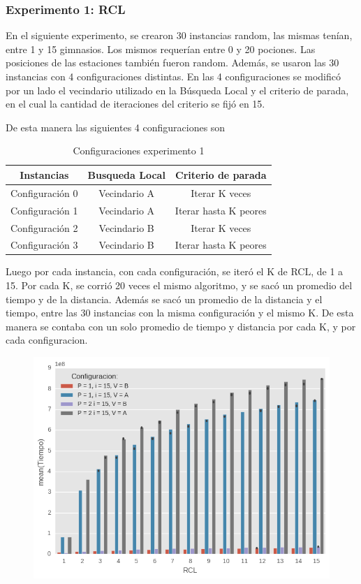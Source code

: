 \subsubsection{Experimento 1: RCL}

En el siguiente experimento, se crearon 30 instancias random, las mismas tenían, entre 1 y 15 gimnasios. Los mismos requerían entre 0 y 20 pociones. Las posiciones de las estaciones también fueron random. Además, se usaron las 30 instancias con 4 configuraciones distintas. En las 4 configuraciones se modificó por un lado el vecindario utilizado en la Búsqueda Local y el criterio de parada, en el cual la cantidad de iteraciones del criterio se fijó en 15.

De esta manera las siguientes 4 configuraciones son 

\begin{table}[H]
\centering
\begin{tabular}{ |c|c|c| } 
 \hline
 Instancias&Busqueda Local&Criterio de parada\\ 
 \hline
 Configuración 0 & Vecindario A & Iterar K veces\\
 \hline
 Configuración 1 & Vecindario A & Iterar hasta K peores\\
 \hline
 Configuración 2 & Vecindario B & Iterar K veces \\
 \hline
 Configuración 3 & Vecindario B & Iterar hasta K peores\\
 \hline
\end{tabular}
\caption{Configuraciones experimento 1}
\end{table}


Luego por cada instancia, con cada configuración, se iteró el K de RCL, de 1 a 15. Por cada K, se corrió 20 veces el mismo algoritmo, y se sacó un promedio del tiempo y de la distancia.
Además se sacó un promedio de la distancia y el tiempo, entre las 30 instancias con la misma configuración y el mismo K. De esta manera se contaba con un solo promedio de tiempo y distancia por cada K, y por cada configuracion.

  \begin{figure}[H]
      \begin{center}
        \includegraphics[width=0.7\columnwidth]{imagenes/Ej4/ej4_exp1_Tiempo.png}
      \end{center}
  \end{figure}


